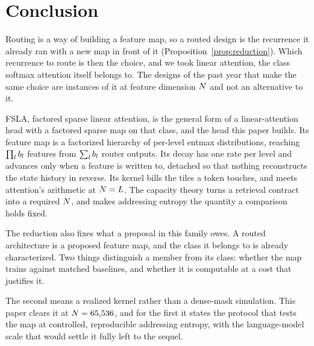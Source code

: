 %
\section{Conclusion}
\label{sec:conclusion}

Routing is a way of building a feature map, so a routed design is the recurrence it already ran with a new map in front of it (Proposition~\ref{prop:reduction}). Which recurrence to route is then the choice, and we took linear attention, the class softmax attention itself belongs to. The designs of the past year that make the same choice are instances of it at feature dimension $N$ and not an alternative to it.

FSLA, factored sparse linear attention, is the general form of a linear-attention head with a factored sparse map on that class, and the head this paper builds. Its feature map is a factorized hierarchy of per-level entmax distributions, reaching $\prod_l b_l$ features from $\sum_l b_l$ router outputs. Its decay has one rate per level and advances only when a feature is written to, detached so that nothing reconstructs the state history in reverse. Its kernel bills the tiles a token touches, and meets attention's arithmetic at $N = L$. The capacity theory turns a retrieval contract into a required $N$, and makes addressing entropy the quantity a comparison holds fixed.

The reduction also fixes what a proposal in this family owes. A routed architecture is a proposed feature map, and the class it belongs to is already characterized. Two things distinguish a member from its class: whether the map trains against matched baselines, and whether it is computable at a cost that justifies it.

The second means a realized kernel rather than a dense-mask simulation. This paper clears it at $N = 65{,}536$, and for the first it states the protocol that tests the map at controlled, reproducible addressing entropy, with the language-model scale that would settle it fully left to the sequel.
